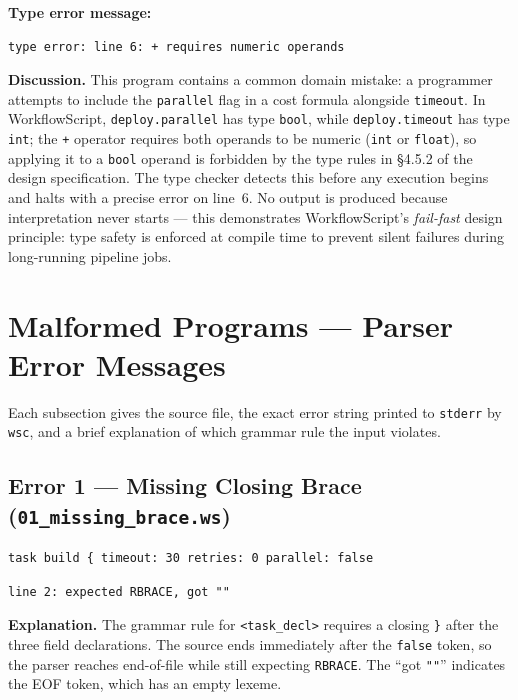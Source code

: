 \documentclass[10pt,a4paper]{article}
\begin{document}
\noindent\textbf{Type error message:}
\begin{lstlisting}[style=error]
type error: line 6: + requires numeric operands
\end{lstlisting}

\noindent\textbf{Discussion.}
This program contains a common domain mistake: a programmer attempts to include the
\texttt{parallel} flag in a cost formula alongside \texttt{timeout}.
In WorkflowScript, \texttt{deploy.parallel} has type \texttt{bool}, while
\texttt{deploy.timeout} has type \texttt{int}; the \texttt{+} operator requires both
operands to be numeric (\texttt{int} or \texttt{float}), so applying it to a
\texttt{bool} operand is forbidden by the type rules in \S4.5.2 of the design
specification.
The type checker detects this before any execution begins and halts with a precise error
on line~6.
No output is produced because interpretation never starts --- this demonstrates
WorkflowScript's \emph{fail-fast} design principle: type safety is enforced at compile
time to prevent silent failures during long-running pipeline jobs.

\section{Malformed Programs --- Parser Error Messages}
\label{sec:invalid}

Each subsection gives the source file, the exact error string printed to \texttt{stderr}
by \texttt{wsc}, and a brief explanation of which grammar rule the input violates.

\subsection{Error 1 --- Missing Closing Brace (\texttt{01\_missing\_brace.ws})}

\begin{lstlisting}[caption={01\_missing\_brace.ws}]
task build { timeout: 30 retries: 0 parallel: false
\end{lstlisting}

\begin{lstlisting}[style=error]
line 2: expected RBRACE, got ""
\end{lstlisting}

\noindent\textbf{Explanation.}
The grammar rule for \texttt{<task\_decl>} requires a closing \texttt{\}} after the
three field declarations.  The source ends immediately after the \texttt{false} token,
so the parser reaches end-of-file while still expecting \texttt{RBRACE}.
The ``got \texttt{""}'' indicates the EOF token, which has an empty lexeme.
\end{document}
